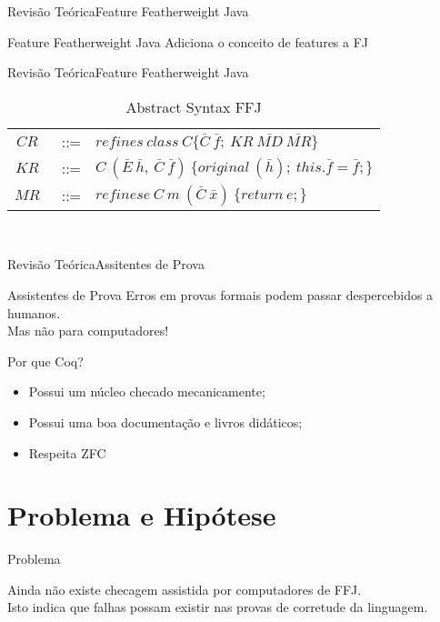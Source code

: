 \documentclass{beamer}
\begin{document}
	\begin{frame}{Revisão Teórica}{Feature Featherweight Java}
		\centering
		\begin{block}{Feature Featherweight Java}
			Adiciona o conceito de features a FJ
		\end{block}
	\end{frame}	
	
	\begin{frame}{Revisão Teórica}{Feature Featherweight Java}
	\centering
	\begin{table}[ht!]
		\caption{Abstract Syntax FFJ}
		\begin{tabular}{ccl}
			$CR$&~::= & $refines\ class\ C\{\bar{C} \ \bar{f};\ KR\
			\bar{MD}\ \bar{MR}\}$\\ 
			\vspace{0.8mm}
			$KR$&~::= &
			$C~(\bar{E}~\bar{h},\ \bar{C}~\bar{f})\
			\{original~(\bar{h});~this.\bar{f}=\bar{f};\}$\\
			\vspace{0.8mm}
			$MR$&~::= & $refinese\ C~m~(\bar{C}~\bar{x})\ \{return~e;\}$\\
		\end{tabular} \\
		\vspace{1.5mm}
		\label{abstractsyntax}
	\end{table}
\end{frame}

	
	\begin{frame}{Revisão Teórica}{Assitentes de Prova}
		\centering
		\begin{block}{Assistentes de Prova}
			Erros em provas formais podem passar despercebidos a humanos.\\
			Mas não para computadores!
		\end{block}
		
		\begin{block}{Por que Coq?}
			\begin{itemize}
				\item Possui um núcleo checado mecanicamente;
				\item Possui uma boa documentação e livros didáticos;
				\item Respeita ZFC
			\end{itemize}
		\end{block}
	\end{frame}

	
	\section{Problema e Hipótese}
	\begin{frame}{Problema}
		\begin{block}{}
			Ainda não existe checagem assistida por computadores de FFJ. \\
			Isto indica que falhas possam existir nas provas de corretude da linguagem.
		\end{block}
	\end{frame}
	
\end{document}
